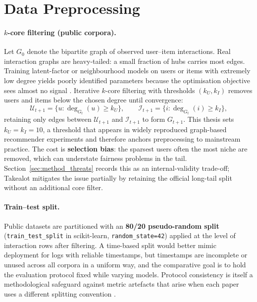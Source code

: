 \section{Data Preprocessing}
\label{sec:method_preprocessing}

\paragraph{$k$-core filtering (public corpora).}
Let $G_0$ denote the bipartite graph of observed user--item interactions. Real interaction graphs are heavy-tailed: a small fraction of hubs carries most edges. Training latent-factor or neighbourhood models on users or items with extremely low degree yields poorly identified parameters because the optimisation objective sees almost no signal \citep{adomavicius2005toward}. Iterative $k$-core filtering with thresholds $(k_U,k_I)$ removes users and items below the chosen degree until convergence:
\begin{equation}
  \mathcal{U}_{t+1} = \bigl\{ u : \deg_{G_t}(u) \ge k_U \bigr\}, \qquad
  \mathcal{I}_{t+1} = \bigl\{ i : \deg_{G_t}(i) \ge k_I \bigr\},
\end{equation}
retaining only edges between $\mathcal{U}_{t+1}$ and $\mathcal{I}_{t+1}$ to form $G_{t+1}$. This thesis sets $k_U=k_I=10$, a threshold that appears in widely reproduced graph-based recommender experiments \citep{he2020lightgcn, wang2019ngcf} and therefore anchors preprocessing to mainstream practice. The cost is \textbf{selection bias}: the sparsest users often the most niche are removed, which can understate fairness problems in the tail. Section~\ref{sec:method_threats} records this as an internal-validity trade-off; Takealot mitigates the issue partially by retaining the official long-tail split without an additional core filter.

\paragraph{Train--test split.}
Public datasets are partitioned with an \textbf{80/20 pseudo-random split} (\texttt{train\_test\_split} in scikit-learn, \texttt{random\_state=42}) applied at the level of interaction rows after filtering. A time-based split would better mimic deployment for logs with reliable timestamps, but timestamps are incomplete or unused across all corpora in a uniform way, and the comparative goal is to hold the evaluation protocol fixed while varying models. Protocol consistency is itself a methodological safeguard against metric artefacts that arise when each paper uses a different splitting convention \citep{bellogin2017statistical, ferrari2019progress}.

